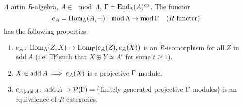 \begin{prop}
\label{prop:48}
$\Lambda$ artin $R$-algebra, $A \in \mod\Lambda$, $\Gamma
= \operatorname{End}_\Lambda(A)^{{\operatorname{op}\nolimits}}$. The functor 
\[ e_A = \operatorname{Hom}_\Lambda(A, -) \colon \operatorname{mod}\nolimits\Lambda \to
  \operatorname{mod}\nolimits\Gamma \;\;\;\; (R\text{-functor}) \] 
has the following properties: 
\begin{enumerate}[\rm(a)]
\item $e_A \colon \operatorname{Hom}_\Lambda(Z, X) \to \operatorname{Hom}_\Gamma(e_A(Z), e_A(X))$ is
  an $R$-isomorphism for all $Z$ in $\operatorname{add} A$ (i.e. $\exists Y$ such
  that $X \oplus Y \simeq A^t$ for some $t \geq 1$). 
\item $X \in \operatorname{add} A \implies e_A(X)$ is a projective $\Gamma$-module.
\item ${e_A}_{\mid \operatorname{add} A} \colon \operatorname{add} A \to \mathcal{P}(\Gamma) = \{
  $finitely generated projective $\Gamma$-modules$ \}$ is an equivalence
  of $R$-categories. 
\end{enumerate}
\end{prop}
